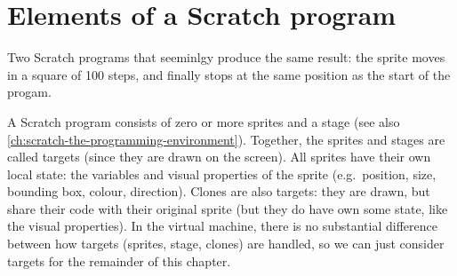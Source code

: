 \documentclass[../main]{subfiles}
\begin{document}
\section{Elements of a Scratch program}\label{sec:elements-of-a-scratch-program}

\begin{listing}
    \centering
    \begin{subfigure}{0.45\textwidth}
        \centering
        \begin{scratch}[scale=0.7]
        \end{scratch}
    \end{subfigure}
    \begin{subfigure}{0.45\textwidth}
        \centering
        \begin{scratch}[scale=0.7]
        \end{scratch}
    \end{subfigure}
    \caption{Two Scratch programs that seeminlgy produce the same result: the sprite moves in a square of 100 steps, and finally stops at the same position as the start of the progam.}
    \label{lst:scratch-two-programs}
\end{listing}

A Scratch program consists of zero or more sprites and a stage (see also \cref{ch:scratch-the-programming-environment}).
Together, the sprites and stages are called targets (since they are drawn on the screen).
All sprites have their own local state: the variables and visual properties of the sprite (e.g.\ position, size, bounding box, colour, direction).
Clones are also targets: they are drawn, but share their code with their original sprite (but they do have own some state, like the visual properties).
In the virtual machine, there is no substantial difference between how targets (sprites, stage, clones) are handled, so we can just consider targets for the remainder of this chapter.
\end{document}
